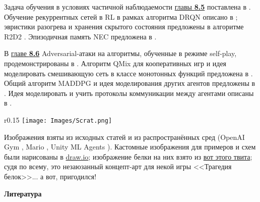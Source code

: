 Задача обучения в условиях частичной наблюдаемости \underline{главы \textbf{8.5}}  поставлена в \cite{smallwood1973optimal}. Обучение рекуррентных сетей в RL в рамках алгоритма DRQN описано в \cite{hausknecht2015deep}; эвристики разогрева и хранения скрытого состояния предложены в алгоритме R2D2 \cite{horgan2018distributed}. Эпизодичная память NEC предложена в \cite{pritzel2017neural}.

В \underline{главе \textbf{8.6}} Adversarial-атаки на алгоритмы, обученные в режиме self-play, продемонстрированы в \cite{gleave2019adversarial}. Алгоритм QMix для кооперативных игр и идея моделировать смешивающую сеть в классе монотонных функций предложена в \cite{rashid2018qmix}. Общий алгоритм MADDPG и идея моделирования других агентов предложены в \cite{lowe2017multi}. Идея моделировать и учить протоколы коммуникации между агентами описаны в \cite{foerster2016learning}.

\begin{wrapfigure}{r}{0.15\textwidth}
\vspace{-0.5cm}
\centering
\texttt{[image: Images/Scrat.png]}
\vspace{-0.8cm}
\end{wrapfigure}

Изображения взяты из исходных статей и из распространённых сред (OpenAI Gym \cite{brockman2016openai}, Mario \cite{gym-super-mario-bros}, Unity ML Agents \cite{juliani2018unity}). Кастомные изображения для примеров и схем были нарисованы в \href{https://www.draw.io/}{draw.io}; изображение белки на них взято из \href{https://twitter.com/racefornuts/status/690043558208913408}{вот этого твита}; судя по всему, это незаюзанный концепт-арт для некой игры <<Трагедия белок>>... а вот, пригодился!

\newpage
\huge \textbf{\textcolor{ChadBlue}{Литература}}
\normalsize
